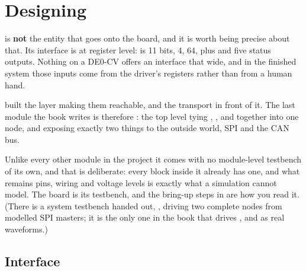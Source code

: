 
\section{Designing }
\label{c19:sec:node}

 is \textbf{not} the entity that goes onto the board, and it is worth being
precise about that. Its interface is at register level:  is 11 bits,  4,
 64, plus  and five status outputs. Nothing on a DE0-CV offers an
interface that wide, and in the finished system those inputs come from the driver's registers rather
than from a human hand.

 built the layer making them reachable, and  the transport in
front of it. The last module the book writes is therefore : the top level
tying , ,  and 
together into one node, and exposing exactly two things to the outside world, SPI and the CAN bus.

Unlike every other module in the project it comes with no module-level testbench of its own, and that
is deliberate: every block inside it already has one, and what remains \textemdash{} pins, wiring and
voltage levels \textemdash{} is exactly what a simulation cannot model. The board is its testbench,
and the bring-up steps in  are how you read it. (There is a system testbench
handed out, , driving two complete nodes from modelled SPI masters; it is the
only one in the book that drives ,  and  as real waveforms.)

\subsection*{Interface}

